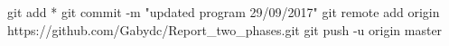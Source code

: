 git add *
git commit -m "updated program 29/09/2017"
git remote add origin https://github.com/Gabydc/Report_two_phases.git
git push -u origin master
